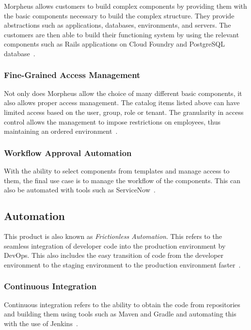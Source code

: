 Morpheus allows customers to build complex components by providing them with
the basic components necessary to build the complex structure. They provide
abstractions such as applications, databases, environments, and servers. The
customers are then able to build their functioning system by using the relevant
components such as Rails applications on Cloud Foundry and PostgreSQL
database~\cite{hid-sp18-416-www-morpheus-control}.

\subsubsection{Fine-Grained Access Management}

Not only does Morpheus allow the choice of many different basic components, it
also allows proper access management. The catalog items listed above can have
limited access based on the user, group, role or tenant. The granularity in
access control allows the management to impose restrictions on employees, thus
maintaining an ordered environment~\cite{hid-sp18-416-www-morpheus-control}.

\subsubsection{Workflow Approval Automation}

With the ability to select components from templates and manage access to them,
the final use case is to manage the workflow of the components. This can also
be automated with tools such as
ServiceNow~\cite{hid-sp18-416-www-morpheus-control}.

\subsection{Automation}

This product is also known as \textit{Frictionless Automation}. This refers to
the seamless integration of developer code into the production environment by
DevOps. This also includes the easy transition of code from the developer
environment to the staging environment to the production environment
faster~\cite{hid-sp18-416-www-morpheus-product-guide}.

\subsubsection{Continuous Integration}

Continuous integration refers to the ability to obtain the code from
repositories and building them using tools such as Maven and Gradle and
automating this with the use of
Jenkins~\cite{hid-sp18-416-www-morpheus-automation}.

